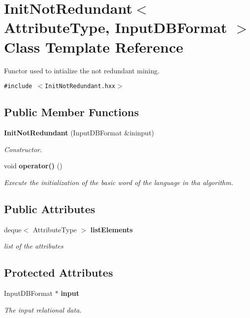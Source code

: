 \section{Init\-Not\-Redundant$<$ Attribute\-Type, Input\-DBFormat $>$ Class Template Reference}
\label{class_init_not_redundant}
Functor used to intialize the not redundant mining.  


{\tt \#include $<$Init\-Not\-Redundant.hxx$>$}

\subsection*{Public Member Functions}
\begin{CompactItemize}
\item 
{\bf Init\-Not\-Redundant} (Input\-DBFormat \&ininput)\label{class_init_not_redundant_d169f4a3f2eb976af106e0124464b565}

\begin{CompactList}\small\item\em Constructor. \item\end{CompactList}\item 
void {\bf operator()} ()\label{class_init_not_redundant_24707819150e4e829279f7938706cb24}

\begin{CompactList}\small\item\em Execute the initialization of the basic word of the language in tha algorithm. \item\end{CompactList}\end{CompactItemize}
\subsection*{Public Attributes}
\begin{CompactItemize}
\item 
deque$<$ Attribute\-Type $>$ {\bf list\-Elements}\label{class_init_not_redundant_1cc4c4146467d2e83713fa74d6d937a1}

\begin{CompactList}\small\item\em list of the attributes \item\end{CompactList}\end{CompactItemize}
\subsection*{Protected Attributes}
\begin{CompactItemize}
\item 
Input\-DBFormat $\ast$ {\bf input}\label{class_init_not_redundant_6e3f7540b33fa3b896ded5437e7d430c}

\begin{CompactList}\small\item\em The input relational data. \item\end{CompactList}\end{CompactItemize}


